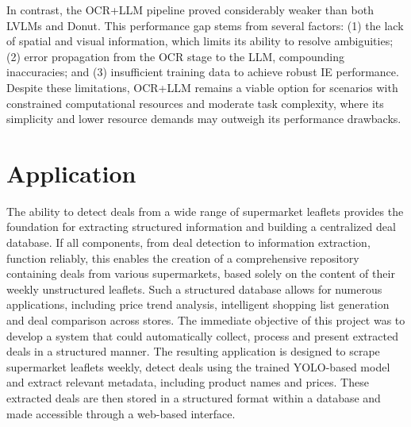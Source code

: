 \documentclass[11pt]{article}
\begin{document}
In contrast, the OCR+LLM pipeline proved considerably weaker than both LVLMs and Donut. This performance gap stems from several factors: (1) the lack of spatial and visual information, which limits its ability to resolve ambiguities; (2) error propagation from the OCR stage to the LLM, compounding inaccuracies; and (3) insufficient training data to achieve robust IE performance. Despite these limitations, OCR+LLM remains a viable option for scenarios with constrained computational resources and moderate task complexity, where its simplicity and lower resource demands may outweigh its performance drawbacks.


\section{Application}
\label{sec:application}
The ability to detect deals from a wide range of supermarket leaflets provides the foundation for extracting structured information and building a centralized deal database. If all components, from deal detection to information extraction, function reliably, this enables the creation of a comprehensive repository containing deals from various supermarkets, based solely on the content of their weekly unstructured leaflets. Such a structured database allows for numerous applications, including price trend analysis, intelligent shopping list generation and deal comparison across stores. The immediate objective of this project was to develop a system that could automatically collect, process and present extracted deals in a structured manner. The resulting application is designed to scrape supermarket leaflets weekly, detect deals using the trained YOLO-based model and extract relevant metadata, including product names and prices. These extracted deals are then stored in a structured format within a database and made accessible through a web-based interface.
\end{document}
